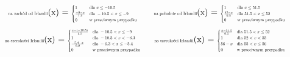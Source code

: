 \documentclass{article}
\begin{document}
\begin{equation*}
\begin{minipage}{0.5\textwidth}
\centering
\text{\scalebox{0.5}{na zachód od Irlandii}}(x) = \scalebox{0.5}{$
\begin{cases}
1 & \text{dla } x \leq -10.5 \\
\frac{-9 - x}{1.5} & \text{dla } -10.5 < x \leq -9 \\
0 & \text{w przeciwnym przypadku}
\end{cases}
$}
\end{minipage}%
\begin{minipage}{0.5\textwidth}
\centering
\text{\scalebox{0.5}{na południe od Irlandii}}(x) = \scalebox{0.5}{$
\begin{cases}
1 & \text{dla } x \leq 51.5 \\
\frac{52 - x}{0.5} & \text{dla } 51.5 < x \leq 52 \\
0 & \text{w przeciwnym przypadku}
\end{cases}
$}
\end{minipage}
\end{equation*}
\begin{equation*}
\begin{minipage}{0.5\textwidth}
\centering
\text{\scalebox{0.5}{na szerokości Irlandii}}(x) = \scalebox{0.5}{$
\begin{cases}
\frac{x - (-10.5)}{1.5} & \text{dla } -10.5 < x \leq -9 \\
1 & \text{dla } -10.5 < x < -6.3 \\
\frac{-5.4 - x}{0.9} & \text{dla } -6.3 < x \leq -5.4 \\
0 & \text{w przeciwnym przypadku}
\end{cases}
$}
\end{minipage}%
\begin{minipage}{0.5\textwidth}
\centering
\text{\scalebox{0.5}{na szerokości Irlandii}}(x) = \scalebox{0.5}{$
\begin{cases}
\frac{x - 51.5}{0.5} & \text{dla } 51.5 < x \leq 52 \\
1 & \text{dla } 52 < x < 55 \\
56 - x & \text{dla } 55 < x \leq 56 \\
0 & \text{w przeciwnym przypadku}
\end{cases}
$}
\end{minipage}
\end{equation*}
\end{document}
